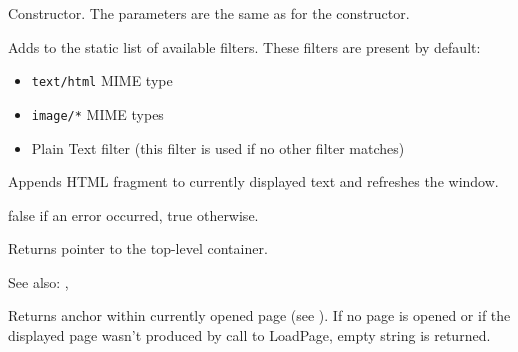 Constructor. The parameters are the same as for the  constructor.



\label{wxhtmlwindowaddfilter}


Adds  to the static list of available
filters. These filters are present by default:

\begin{itemize}\itemsep=0pt
\item {\tt text/html} MIME type
\item {\tt image/*} MIME types
\item Plain Text filter (this filter is used if no other filter matches)
\end{itemize}

\label{wxhtmlwindowappendtopage}


Appends HTML fragment to currently displayed text and refreshes the window. 




false if an error occurred, true otherwise.

\label{wxhtmlwindowgetinternalrepresentation}


Returns pointer to the top-level container.

See also: , 

\label{wxhtmlwindowgetopenedanchor}


Returns anchor within currently opened page
(see ). 
If no page is opened or if the displayed page wasn't
produced by call to LoadPage, empty string is returned.


